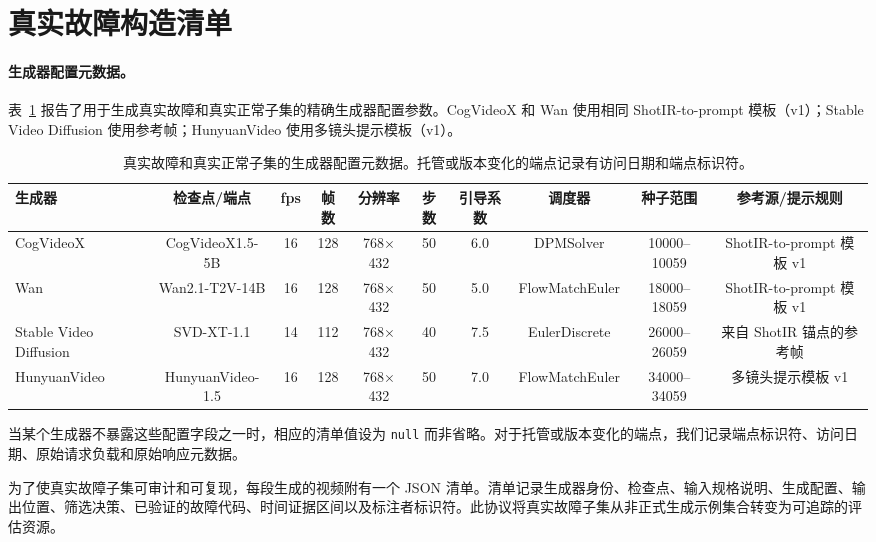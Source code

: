 \documentclass{article}
\begin{document}
\section{真实故障构造清单}
\label{app:real_failure_manifest}

\begin{table}[t]
\centering\scriptsize
\caption{真实故障和真实正常子集的生成器配置元数据。托管或版本变化的端点记录有访问日期和端点标识符。}
\paragraph{生成器配置元数据。}
表~\ref{tab:generator_config} 报告了用于生成真实故障和真实正常子集的精确生成器配置参数。CogVideoX 和 Wan 使用相同 ShotIR-to-prompt 模板（v1）；Stable Video Diffusion 使用参考帧；HunyuanVideo 使用多镜头提示模板（v1）。

\label{tab:generator_config}
\begin{adjustbox}{max width=\textwidth}
\begin{tabular}{lccccccccc}
\toprule
生成器 & 检查点/端点 & fps & 帧数 & 分辨率 & 步数 & 引导系数 & 调度器 & 种子范围 & 参考源/提示规则 \\
\midrule
CogVideoX & CogVideoX1.5-5B & 16 & 128 & 768$\times$432 & 50 & 6.0 & DPMSolver & 10000--10059 & ShotIR-to-prompt 模板 v1 \\
Wan & Wan2.1-T2V-14B & 16 & 128 & 768$\times$432 & 50 & 5.0 & FlowMatchEuler & 18000--18059 & ShotIR-to-prompt 模板 v1 \\
Stable Video Diffusion & SVD-XT-1.1 & 14 & 112 & 768$\times$432 & 40 & 7.5 & EulerDiscrete & 26000--26059 & 来自 ShotIR 锚点的参考帧 \\
HunyuanVideo & HunyuanVideo-1.5 & 16 & 128 & 768$\times$432 & 50 & 7.0 & FlowMatchEuler & 34000--34059 & 多镜头提示模板 v1 \\
\bottomrule
\end{tabular}
\end{adjustbox}
\end{table}

当某个生成器不暴露这些配置字段之一时，相应的清单值设为 \texttt{null} 而非省略。对于托管或版本变化的端点，我们记录端点标识符、访问日期、原始请求负载和原始响应元数据。

为了使真实故障子集可审计和可复现，每段生成的视频附有一个 JSON 清单。清单记录生成器身份、检查点、输入规格说明、生成配置、输出位置、筛选决策、已验证的故障代码、时间证据区间以及标注者标识符。此协议将真实故障子集从非正式生成示例集合转变为可追踪的评估资源。
\end{document}
